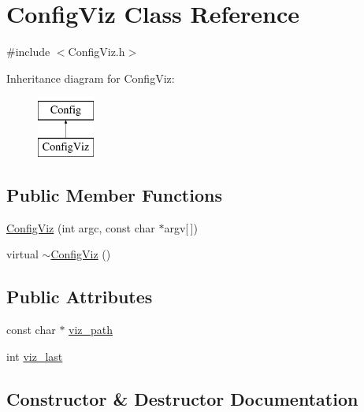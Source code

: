 \hypertarget{classConfigViz}{}\section{Config\+Viz Class Reference}
\label{classConfigViz}


{\ttfamily \#include $<$Config\+Viz.\+h$>$}

Inheritance diagram for Config\+Viz\+:\begin{figure}[H]
\begin{center}
\leavevmode
\includegraphics[height=2.000000cm]{classConfigViz}
\end{center}
\end{figure}
\subsection*{Public Member Functions}
\begin{DoxyCompactItemize}
\item 
\mbox{\hyperlink{classConfigViz_acf241b368868e081009a6c46b2efcf46}{Config\+Viz}} (int argc, const char $\ast$argv\mbox{[}$\,$\mbox{]})
\item 
virtual \mbox{\hyperlink{classConfigViz_a2adcf8c92aa6e143eef56dc8fd2a0507}{$\sim$\+Config\+Viz}} ()
\end{DoxyCompactItemize}
\subsection*{Public Attributes}
\begin{DoxyCompactItemize}
\item 
const char $\ast$ \mbox{\hyperlink{classConfigViz_abdd3217c8d60e041cc8d896737614a9b}{viz\+\_\+path}}
\item 
int \mbox{\hyperlink{classConfigViz_af233d5fb057e36f7ec45f9091f4a118c}{viz\+\_\+last}}
\end{DoxyCompactItemize}


\subsection{Constructor \& Destructor Documentation}
\mbox{\label{classConfigViz_acf241b368868e081009a6c46b2efcf46}} 
